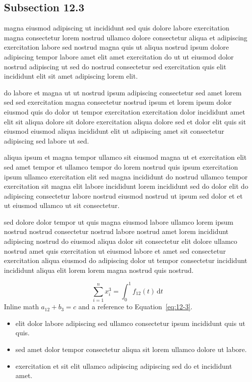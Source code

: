 \documentclass{article}
\begin{document}
\subsection{Subsection 12.3}\label{sec:12-3}
magna eiusmod adipiscing ut incididunt sed quis dolore labore exercitation magna consectetur lorem nostrud ullamco dolore consectetur aliqua et adipiscing exercitation labore sed nostrud magna quis ut aliqua nostrud ipsum dolore adipiscing tempor labore amet elit amet exercitation do ut ut eiusmod dolor nostrud adipiscing ut sed do nostrud consectetur sed exercitation quis elit incididunt elit sit amet adipiscing lorem elit.

do labore et magna ut ut nostrud ipsum adipiscing consectetur sed amet lorem sed sed exercitation magna consectetur nostrud ipsum et lorem ipsum dolor eiusmod quis do dolor ut tempor exercitation exercitation dolor incididunt amet elit sit aliqua dolore sit dolore exercitation aliqua dolore sed et dolor elit quis sit eiusmod eiusmod aliqua incididunt elit ut adipiscing amet sit consectetur adipiscing sed labore ut sed.

aliqua ipsum et magna tempor ullamco sit eiusmod magna ut et exercitation elit sed amet tempor et ullamco tempor do lorem nostrud quis ipsum exercitation ipsum ullamco exercitation elit sed magna incididunt do nostrud ullamco tempor exercitation sit magna elit labore incididunt lorem incididunt sed do dolor elit do adipiscing consectetur labore nostrud eiusmod nostrud ut ipsum sed dolor et et ut eiusmod ullamco ut sit consectetur.

sed dolore dolor tempor ut quis magna eiusmod labore ullamco lorem ipsum nostrud nostrud consectetur nostrud labore nostrud amet lorem incididunt adipiscing nostrud do eiusmod aliqua dolor sit consectetur elit dolore ullamco nostrud amet quis exercitation ut eiusmod labore et amet sed consectetur exercitation aliqua eiusmod do adipiscing dolor ut tempor consectetur incididunt incididunt aliqua elit lorem lorem magna nostrud quis nostrud.

\begin{equation}\label{eq:12-3}
  \sum_{i=1}^{n} x_i^{3} = \int_0^1 f_{12}(t)\,\mathrm{d}t
\end{equation}
Inline math $a_{12} + b_{3} = c$ and a reference to Equation~\eqref{eq:12-3}.

\begin{itemize}
  \item elit dolor labore adipiscing sed ullamco consectetur ipsum incididunt quis ut quis.
  \item sed amet dolor tempor consectetur aliqua sit lorem ullamco dolore ut labore.
  \item exercitation et sit elit ullamco adipiscing adipiscing sed do et incididunt amet.
\end{itemize}
\end{document}

